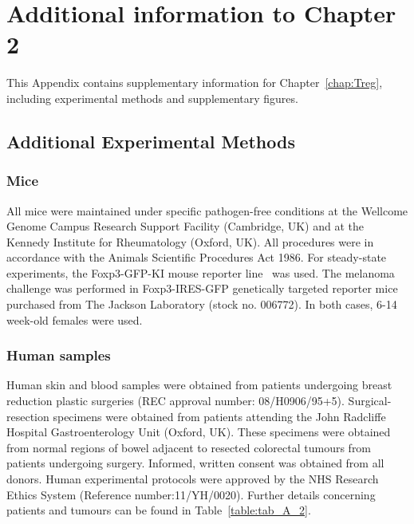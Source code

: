
\chapter{Additional information to Chapter 2} \label{appendix:treg}
This Appendix contains supplementary information for Chapter~\ref{chap:Treg}, including experimental methods and supplementary figures.

\section{Additional Experimental Methods}
\label{sectionA1.1}
\subsection{Mice}
All mice were maintained under specific pathogen-free conditions at the Wellcome Genome Campus Research Support Facility (Cambridge, UK) and at the Kennedy Institute for Rheumatology (Oxford, UK). All procedures were in accordance with the Animals Scientific Procedures Act 1986. For steady-state experiments, the Foxp3-GFP-KI mouse reporter line~\citep{Bettelli2006-dw} was used. The melanoma challenge was performed in Foxp3-IRES-GFP genetically targeted reporter mice~\citep{Haribhai2007-tk} purchased from The Jackson Laboratory (stock no. 006772). In both cases, 6-14 week-old females were used.

\subsection{Human samples}
Human skin and blood samples were obtained from patients undergoing breast reduction plastic surgeries (REC approval number: 08/H0906/95+5). Surgical-resection specimens were obtained from patients attending the John Radcliffe Hospital Gastroenterology Unit (Oxford, UK). These specimens were obtained from normal regions of bowel adjacent to resected colorectal tumours from patients undergoing surgery. Informed, written consent was obtained from all donors. Human experimental protocols were approved by the NHS Research Ethics System (Reference number:11/YH/0020). Further details concerning patients and tumours can be found in Table~\ref{table:tab_A_2}.

